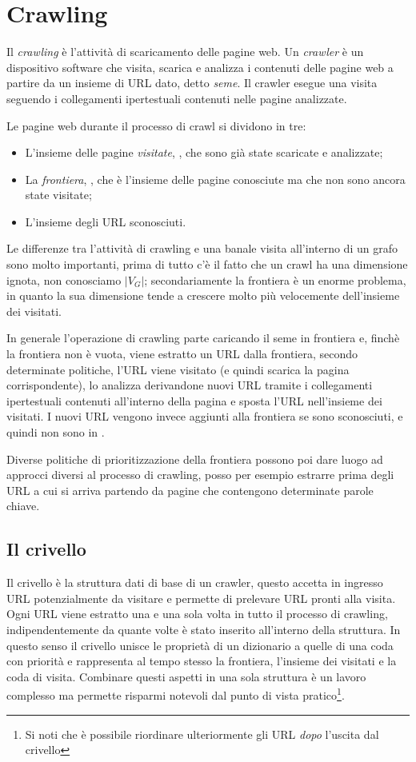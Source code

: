 \section{Crawling}
Il \textit{crawling} è l'attività di scaricamento delle pagine web. Un \textit{crawler} è un dispositivo software che visita, scarica e analizza i contenuti delle pagine web a partire da un insieme di URL dato, detto \textit{seme}. Il crawler esegue una visita seguendo i collegamenti ipertestuali contenuti nelle pagine analizzate.

Le pagine web durante il processo di crawl si dividono in tre:
\begin{itemize}
    \item L'insieme delle pagine \textit{visitate}, , che sono già state scaricate e analizzate;
    \item La \textit{frontiera}, , che è l'insieme delle pagine conosciute ma che non sono ancora state visitate;
    \item L'insieme  degli URL sconosciuti.
\end{itemize}
Le differenze tra l'attività di crawling e una banale visita all'interno di un grafo sono molto importanti, prima di tutto c'è il fatto che un crawl ha una dimensione ignota, non conosciamo $|V_G|$; secondariamente la frontiera è un enorme problema, in quanto la sua dimensione tende a crescere molto più velocemente dell'insieme dei visitati.

In generale l'operazione di crawling parte caricando il seme in frontiera e, finchè la frontiera non è vuota, viene estratto un URL dalla frontiera, secondo determinate politiche, l'URL viene visitato (e quindi scarica la pagina corrispondente), lo analizza derivandone nuovi URL tramite i collegamenti ipertestuali contenuti all'interno della pagina e sposta l'URL nell'insieme dei visitati. I nuovi URL vengono invece aggiunti alla frontiera se sono sconosciuti, e quindi non sono in .

Diverse politiche di prioritizzazione della frontiera possono poi dare luogo ad approcci diversi al processo di crawling, posso per esempio estrarre prima degli URL a cui si arriva partendo da pagine che contengono determinate parole chiave.
\subsection{Il crivello}
Il crivello è la struttura dati di base di un crawler, questo accetta in ingresso URL potenzialmente da visitare e permette di prelevare URL pronti alla visita. Ogni URL viene estratto una e una sola volta in tutto il processo di crawling, indipendentemente da quante volte è stato inserito all'interno della struttura. In questo senso il crivello unisce le proprietà di un dizionario a quelle di una coda con priorità e rappresenta al tempo stesso la frontiera, l'insieme dei visitati e la coda di visita. Combinare questi aspetti in una sola struttura è un lavoro complesso ma permette risparmi notevoli dal punto di vista pratico\footnote{Si noti che è possibile riordinare ulteriormente gli URL \textit{dopo} l'uscita dal crivello}.

